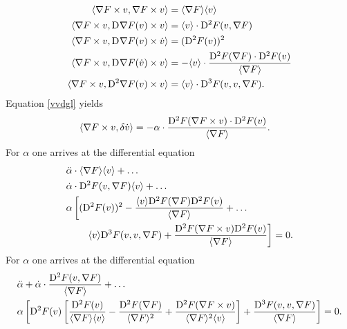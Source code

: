 \begin{subequations}
    \begin{align}
        \langle  \nabla F  \times v ,  \nabla F  \times v  \rangle  &=
        \langle  \nabla F   \rangle \langle  v  \rangle\\
        \langle  \nabla F  \times v ,  \mathrm{D}^{  } \nabla F  ( v ) \times v  \rangle  &=
        \langle  v  \rangle \cdot \mathrm{D}^{ 2 } F ( v, \nabla F  )\\
        \langle  \nabla F  \times v ,  \mathrm{D}^{  } \nabla F  ( v ) \times \dot{ v }  \rangle  &=
        ( \mathrm{D}^{ 2 } F ( v ) )^2\\
        \langle  \nabla F  \times v ,  \mathrm{D}^{  } \nabla F  ( \dot{ v } ) \times v  \rangle  &=
        -  \langle  v  \rangle \cdot \frac{ \mathrm{D}^{ 2 } F ( \nabla F  ) \cdot \mathrm{D}^{ 2 } F ( v ) }{ \langle  \nabla F   \rangle }\\
        \langle  \nabla F  \times v ,  \mathrm{D}^{ 2 } \nabla F  ( v ) \times v  \rangle  &=
        \langle  v  \rangle \cdot \mathrm{D}^{ 3 } F ( v, v, \nabla F  ) .
    \end{align}
\end{subequations}
Equation \eqref{vvdgl} yields
\begin{align}
    \langle  \nabla F  \times v ,  \delta \dot{ v }  \rangle  &=
    -\alpha \cdot \frac{ \mathrm{D}^{ 2 } F ( \nabla F  \times v ) \cdot \mathrm{D}^{ 2 } F ( v ) }{ \langle  \nabla F   \rangle } .
\end{align}
For $ \alpha $ one arrives at the differential equation
\begin{align}
    &\ddot{ \alpha } \cdot \langle  \nabla F   \rangle \langle  v  \rangle  +  \dots\nonumber\\
    &\dot{ \alpha } \cdot \mathrm{D}^{ 2 } F ( v, \nabla F  ) \langle  v  \rangle  +  \dots\nonumber\\
    &\alpha \left[ ( \mathrm{D}^{ 2 } F ( v ) )^2  -
    \frac{ \langle  v  \rangle \mathrm{D}^{ 2 } F ( \nabla F  ) \mathrm{D}^{ 2 } F ( v ) }{ \langle  \nabla F   \rangle }  +  \dots\right.\nonumber\\
    &\qquad\left.\langle  v  \rangle \mathrm{D}^{ 3 } F ( v, v, \nabla F  )  +
    \frac{ \mathrm{D}^{ 2 } F ( \nabla F  \times v ) \mathrm{D}^{ 2 } F ( v ) }{ \langle  \nabla F   \rangle } \right]  =  0 .
\end{align}
For $ \alpha $ one arrives at the differential equation
\begin{align}
    &\ddot{ \alpha }  +
    \dot{ \alpha } \cdot \frac{ \mathrm{D}^{ 2 } F ( v, \nabla F  ) }
    { \langle  \nabla F   \rangle }  +  \dots\nonumber\\
    &\alpha \left[ \mathrm{D}^{ 2 } F ( v ) \left[ \frac{ \mathrm{D}^{ 2 } F ( v ) }{ \langle  \nabla F   \rangle \langle  v  \rangle }  -
    \frac{ \mathrm{D}^{ 2 } F ( \nabla F  ) }{ \langle  \nabla F   \rangle^2 }  +
    \frac{ \mathrm{D}^{ 2 } F ( \nabla F  \times v ) }{ \langle  \nabla F   \rangle^2 \langle  v  \rangle } \right]  +
    \frac{ \mathrm{D}^{ 3 } F ( v, v, \nabla F  ) }{ \langle  \nabla F   \rangle } \right]  =  0 .
\end{align}
